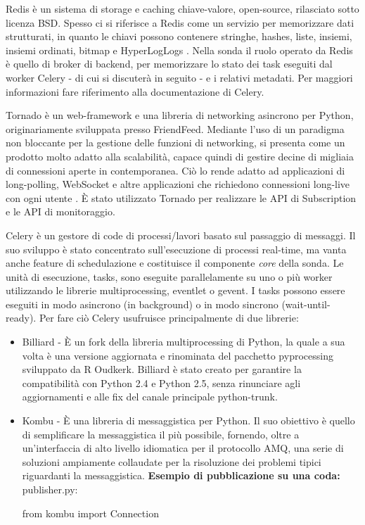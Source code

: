 \documentclass[../main.tex]{subfiles}
\begin{document}
\begin{description}[nolistsep]
\item[Redis]Redis è un sistema di storage e caching chiave-valore, open-source, rilasciato sotto licenza BSD. Spesso ci si riferisce a Redis come un servizio per memorizzare dati strutturati, in quanto le chiavi possono contenere stringhe, hashes, liste, insiemi, insiemi ordinati, bitmap e HyperLogLogs \cite{RedisWebsite}.\newline
Nella sonda il ruolo operato da Redis è quello di broker di backend, per memorizzare lo stato dei task eseguiti dal worker Celery - di cui si discuterà in seguito - e i relativi metadati.
Per maggiori informazioni fare riferimento alla documentazione di Celery.
\item[Tornado]
Tornado è un web-framework e una libreria di networking asincrono per Python, originariamente sviluppata presso FriendFeed.
Mediante l'uso di un paradigma non bloccante per la gestione delle funzioni di networking, si presenta come un prodotto molto adatto alla scalabilità, capace quindi di gestire decine di migliaia di connessioni aperte in contemporanea. Ciò lo rende adatto ad applicazioni di long-polling, WebSocket e altre applicazioni che richiedono connessioni long-live con ogni utente \cite{TornadoWebsite}.\newline
\`E stato utilizzato Tornado per realizzare le API di Subscription e le API di monitoraggio.
\item[Celery]
Celery è un gestore di code di processi/lavori basato sul passaggio di messaggi. Il suo sviluppo è stato concentrato sull'esecuzione di processi real-time, ma vanta anche feature di schedulazione e costituisce il componente \textit{core} della sonda.
Le unità di esecuzione, tasks, sono eseguite parallelamente su uno o più worker utilizzando le librerie multiprocessing, eventlet o gevent.
I tasks possono essere eseguiti in modo asincrono (in background) o in modo sincrono (wait-until-ready).
Per fare ciò Celery usufruisce principalmente di due librerie:
\begin{itemize}[nolistsep]
\item Billiard - \`E un fork della libreria multiprocessing di Python, la quale a sua volta è una versione aggiornata e rinominata del pacchetto pyprocessing sviluppato da R Oudkerk.
Billiard è stato creato per garantire la compatibilità con Python 2.4 e Python 2.5, senza rinunciare agli aggiornamenti e alle fix del canale principale python-trunk.
\item Kombu - \`E una libreria di messaggistica per Python. Il suo obiettivo è quello di semplificare la messaggistica il più possibile, fornendo, oltre a un'interfaccia di alto livello idiomatica per il protocollo AMQ, una serie di soluzioni ampiamente collaudate per la risoluzione dei problemi tipici riguardanti la messaggistica.
\newline\newline
\textbf{Esempio di pubblicazione su una coda:}
publisher.py:
\begin{python}
from kombu import Connection


\end{python}
\end{itemize}
\end{description}
\end{document}
